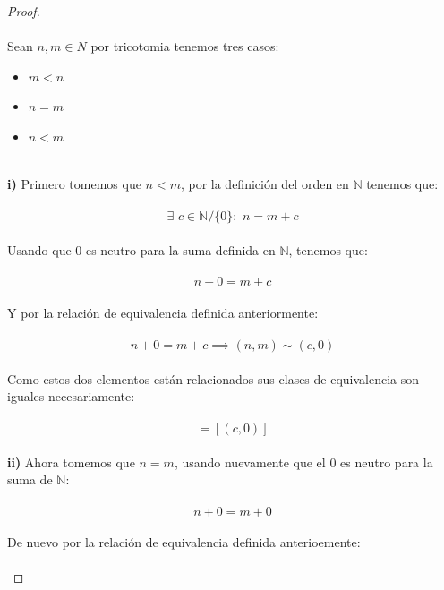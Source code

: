 \documentclass[11pt,letterpaper]{article}
\newcommand{\N}{\mathbb{N}}
\begin{document}
\begin{proof}\,\\
    \,\\
    Sean $n,m\in N$ por tricotomia tenemos tres casos:\,\\
    \begin{itemize}
        \item $m<n$
        \item $n=m$
        \item $n<m$
    \end{itemize}\,\\
    \textbf{i)}\,\,Primero tomemos que $n<m$, por la definici\'on del orden en $\N$ tenemos que:\,\\
    \,\\
    \begin{equation*}
        \exists\,\,c\in \N/\{0\}:\,\,n=m+c
    \end{equation*}\,\\
    Usando que $0$ es neutro para la suma definida en $\N$, tenemos que:\,\\
    \,\\
    \begin{equation*}
        n+0=m+c
    \end{equation*}\,\\
    Y por la relaci\'on de equivalencia definida anteriormente:\,\\
    \,\\
    \begin{equation*}
        n+0=m+c\implies (n,m)\sim(c,0)
    \end{equation*}\,\\
    Como estos dos elementos est\'an relacionados sus clases de equivalencia son iguales necesariamente:\,\\
    \,\\
    \begin{equation*}
        [(n,m)]=[(c,0)]
    \end{equation*}\,\\
    \textbf{ii)}\,\,Ahora tomemos que $n=m$, usando nuevamente que el $0$ es neutro para la suma de $\N$:\,\\
    \,\\
    \begin{equation*}
        n+0=m+0
    \end{equation*}\,\\
    De nuevo por la relaci\'on de equivalencia definida anterioemente:\,\\
    \,\\

\end{proof}
\end{document}
